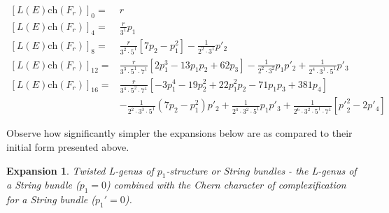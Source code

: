 \documentclass{amsart}
\theoremstyle{plain}
\newcommand{\ch}{\mathrm{ch}}
\numberwithin{equation}{section}
\newtheorem{ex}{Expansion}
\begin{document}
%
%
%
%
%
%
%
%


\begin{tcolorbox}[text width=16cm, height=4.2cm,
title=Twisted L-genus twisted by a String bundle]
{\footnotesize
\begin{align*} 
 {[L(E)\ch(F_r)]}_0 =&r
\\
 {[L(E)\ch(F_r)]}_4 = &\tfrac{r}{3^1} p_1 
\\
 {[L(E)\ch(F_r)]}_8 = &
 \tfrac{r}{3^2\cdot 5^1}  [7 p_2-p_1^2]
 -\tfrac{1}{2^2\cdot 3^1} p'_2
\\
 {[L(E)\ch(F_r)]}_{12}= &
 \tfrac{r}{3^3\cdot 5^1\cdot 7^1}  [2 p_1^3- 13 p_1 p_2+62 p_3]
-\tfrac{1}{2^2\cdot 3^2} p_1  p'_2
+\tfrac{1}{2^4\cdot 3^1\cdot 5^1} p'_3
\\
 {[L(E)\ch(F_r)]}_{16}= &
 \tfrac{r}{3^4\cdot 5^2\cdot 7^1}[-3 p_1^4-19 p_2^2+ 22 p_1^2 p_2 - 71 p_1 p_3+381 p_4]
\\
& 
-\tfrac{1}{2^2\cdot 3^3\cdot 5^1}(7 p_2-p_1^2)  p'_2
+\tfrac{1}{2^4\cdot 3^2\cdot 5^1}p_1  p'_3
+\tfrac{1}{2^6\cdot 3^2\cdot 5^1\cdot 7^1}[{p'}_2^2 -2 p'_4]
\end{align*}
}
\end{tcolorbox}

Observe how significantly simpler the 
expansions below are as compared to their initial form presented above. 

\begin{ex}
Twisted L-genus of $p_1$-structure or String bundles - the L-genus of a String bundle ($p_1=0$) combined with the Chern character of complexification for a String bundle ($p_1'=0$).
\end{ex} 
\end{document}
